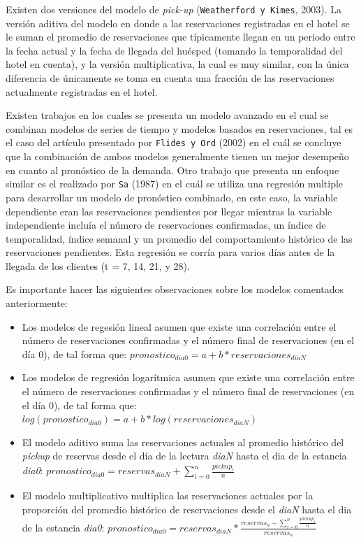 {Existen dos versiones del modelo de \emph{pick-up} (\texttt{Weatherford y Kimes}, 2003). La versión aditiva del modelo en donde a las reservaciones registradas en el hotel se le suman el promedio de reservaciones que típicamente llegan en un periodo entre la fecha actual y la fecha de llegada del huésped (tomando la temporalidad del hotel en cuenta), y la versión multiplicativa, la cual es muy similar, con la única diferencia de únicamente se toma en cuenta una fracción de las reservaciones actualmente registradas en el hotel.

Existen trabajos en los cuales se presenta un modelo avanzado en el cual se combinan modelos de series de tiempo y modelos basados en reservaciones, tal es el caso del artículo presentado por \texttt{Flides y Ord} (2002) en el cuál se concluye que la combinación de ambos modelos generalmente tienen un mejor desempeño en cuanto al pronóstico de la demanda. Otro trabajo que presenta un enfoque similar es el realizado por \texttt{Sa} (1987) en el cuál se utiliza una regresión multiple para desarrollar un modelo de pronóstico combinado, en este caso, la variable dependiente eran las reservaciones pendientes por llegar mientras la variable independiente incluía el número de reservaciones confirmadas, un índice de temporalidad,  índice semanal y un promedio del comportamiento histórico de las reservaciones pendientes. Esta regresión se corría para varios días antes de la llegada de los clientes (t = 7, 14, 21, y 28).

Es importante hacer las siguientes observaciones sobre los modelos comentados anteriormente:

\begin{itemize}
  \item Los modelos de regesión lineal asumen que existe una correlación entre el número de reservaciones confirmadas y el número final de reservaciones (en el día 0), de tal forma que: $pronostico_{dia0} = a + b * reservaciones_{diaN}$
  \item Los modelos de regresión logarítmica asumen que existe una correlación entre el número de reservaciones confirmadas y el número final de reservaciones (en el día 0), de tal forma que: $log(pronostico_{dia0}) = a + b * log(reservaciones_{diaN})$
  \item El modelo aditivo suma las reservaciones actuales al promedio histórico del \emph{pickup} de reservas desde el día de la lectura \emph{diaN} hasta el dia de la estancia \emph{dia0}: $pronostico_{dia0} = reservas_{diaN} + \sum_{i=0}^{n} \frac{pickup_i}{n}$
  \item El modelo multiplicativo multiplica las reservaciones actuales por la proporción del promedio histórico de reservaciones  desde el \emph{diaN} hasta el dia de la estancia \emph{dia0}: $pronostico_{dia0} = reservas_{diaN} * \frac{reservas_n - \sum_{i=0}^{n} \frac{pickup_i}{n}}{reservas_n}$
\end{itemize}

}
